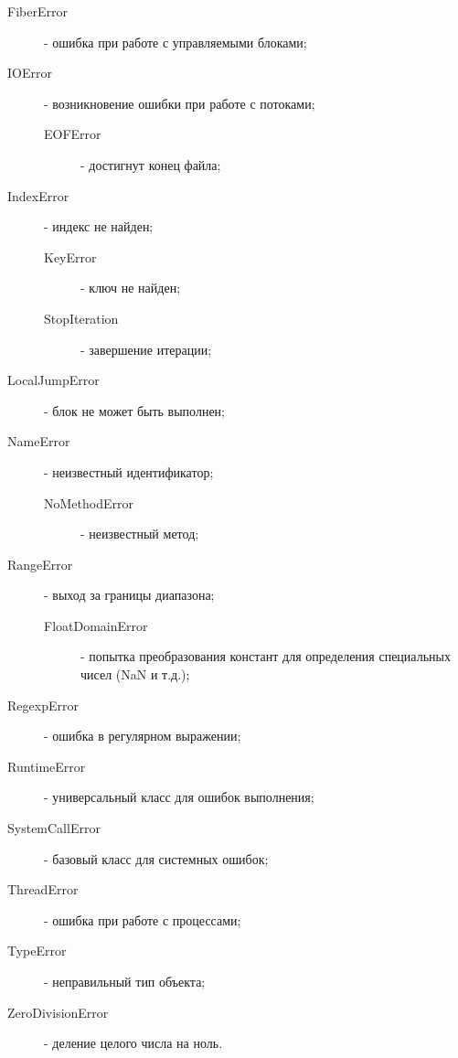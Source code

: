 \begin{description}
\begin{description}
\begin{description}
      \item[FiberError] - ошибка при работе с управляемыми блоками;

      \item[IOError] - возникновение ошибки при работе с потоками;
      \begin{description}
        \item[EOFError] - достигнут конец файла; 
      \end{description}

      \item[IndexError] - индекс не найден;
      \begin{description}
        \item[KeyError] - ключ не найден; 
        \item[StopIteration] - завершение итерации;
      \end{description}

      \item[LocalJumpError] - блок не может быть выполнен;

      \item[NameError] - неизвестный идентификатор;
      \begin{description}
        \item[NoMethodError] - неизвестный метод;
      \end{description}

      \item[RangeError] - выход за границы диапазона;
      \begin{description}
        \item[FloatDomainError] - попытка преобразования констант для определения специальных чисел (NaN и т.д.);
      \end{description}

      \item[RegexpError] - ошибка в регулярном выражении;

      \item[RuntimeError] - универсальный класс для ошибок выполнения;

      \item[SystemCallError] - базовый класс для системных ошибок;

      \item[ThreadError] - ошибка при работе с процессами;

      \item[TypeError] - неправильный тип объекта;

      \item[ZeroDivisionError] - деление целого числа на ноль.
    \end{description}
  \end{description}
\end{description}
 
